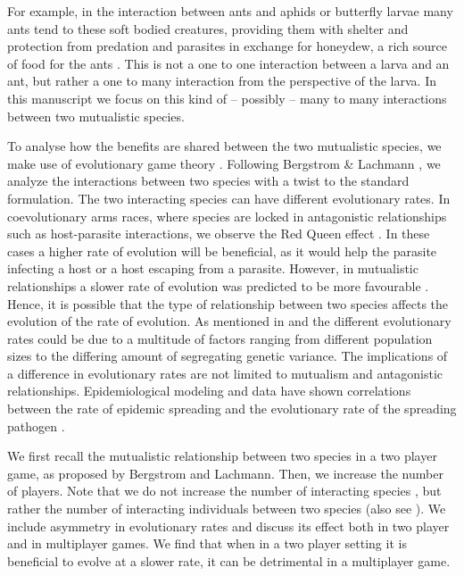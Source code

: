 \documentclass[aps,pre,amsfonts,floatfix, onecolumn,showkeys]{revtex4-1}
\begin{document}
For example, in the interaction between ants and aphids or butterfly larvae \cite{kunkel:BZB:1973,pierce:BES:1987,hoelldobler:book:1990} many ants tend to these soft bodied creatures, providing them with shelter and protection from predation and parasites in exchange for honeydew, a rich source of food for the ants \cite{hill:OEC:1989,stadler:book:2008}.
This is not a one to one interaction between a larva and an ant, but rather a one to many interaction from the perspective of the larva.
In this manuscript we focus on this kind of -- possibly -- many to many interactions between two mutualistic species.


To analyse how the benefits are shared between the two mutualistic species, we make use of evolutionary game theory \cite{weibull:book:1995,hofbauer:JMB:1996,hofbauer:book:1998}.
Following Bergstrom \& Lachmann \cite{bergstrom:PNAS:2003}, we  analyze the interactions between two species with a twist to the standard formulation.
The two interacting species can have different evolutionary rates.
In coevolutionary arms races, where species are locked in antagonistic relationships such as host-parasite interactions, we observe the Red Queen effect \cite{vanValen:EvoTheo:1973}.
In these cases a higher rate of evolution will be beneficial, as it would help the parasite infecting a host or a host escaping from a parasite.
However, in mutualistic relationships a slower rate of evolution was predicted to be more favourable \cite{bergstrom:PNAS:2003}.
Hence, it is possible that the type of relationship between two species affects the evolution of the rate of evolution.
As mentioned in \cite{bergstrom:PNAS:2003} and \cite{dawkins:PRSB:1979} the different evolutionary rates could be due to a multitude of factors ranging from different population sizes to the differing amount of segregating genetic variance.
The implications of a difference in evolutionary rates are not limited to mutualism and antagonistic relationships.
Epidemiological modeling and data have shown correlations between the rate of epidemic spreading and the evolutionary rate of the spreading pathogen \cite{berry:JV:2007,zehender:VIR:2008}.

We first recall the mutualistic relationship between two species in a two player game, as proposed by Bergstrom and Lachmann.
Then, we increase the number of players.
Note that we do not increase the number of interacting species \cite{mack:OIKOS:2008,damore:Evolution:2011}, but rather the number of interacting individuals between two species (also see \cite{wang:JRSI:2011}).
We include asymmetry in evolutionary rates and discuss its effect both in two player and in multiplayer games.
We find that when in a two player setting it is beneficial to evolve at a slower rate, it can be detrimental in a multiplayer game.
\end{document}
